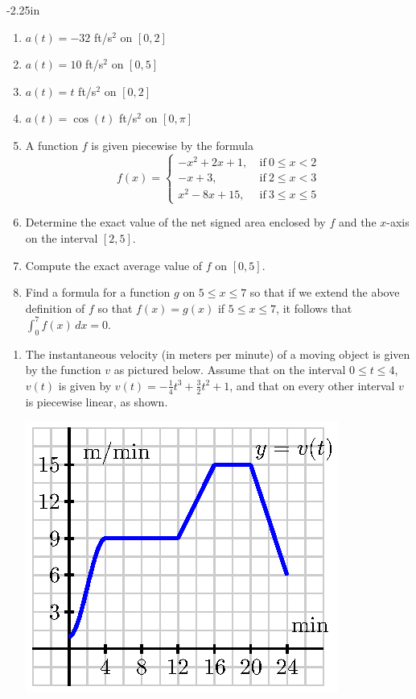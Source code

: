 \begin{adjustwidth*}{}{-2.25in}
\setlength{\columnsep}{25pt}
\begin{multicols*}{2}\small


\begin{enumerate}[1),start=69]
\item $a(t) = -32$ ft/s$^2$ on $[0,2]$
\item $a(t) = 10$ ft/s$^2$ on $[0,5]$
\item $a(t) = t$ ft/s$^2$ on $[0,2]$
\item $a(t) = \cos (t)$ ft/s$^2$ on $[0,\pi]$

    \item A function $f$ is given piecewise by the formula
  $$f(x) = \left\{ 
  	\begin{array}{lr}
	-x^2 + 2x + 1, & \ \mbox{if} \ 0 \le x < 2 \\
	-x + 3, & \ \mbox{if} \ 2 \le x < 3 \\
	x^2 - 8x + 15, & \ \mbox{if} \ 3 \le x \le 5
	\end{array}
	\right.
  $$
  \ba
  	\item Determine the exact value of the net signed area enclosed by $f$ and the $x$-axis on the interval $[2,5]$.
	\item Compute the exact average value of $f$ on $[0,5]$.
	\item Find a formula for a function $g$ on $5 \le x \le 7$ so that if we extend the above definition of $f$ so that $f(x) = g(x)$ if $5 \le x \le 7$, it follows that $\int_0^7 f(x) \, dx = 0.$
  \ea
\end{enumerate}

\begin{enumerate}[1),resume]
 \item The instantaneous velocity (in meters per minute) of a moving object is given by the function $v$ as pictured below.  Assume that on the interval $0 \le t \le 4$, $v(t)$ is given by $v(t) = -\frac{1}{4}t^3 + \frac{3}{2}t^2 + 1$, and that on every other interval $v$ is piecewise linear, as shown.

\includegraphics[scale=.75]{figures/4_4_Ez2.eps}


\end{enumerate}
\end{multicols*}
\end{adjustwidth*}
